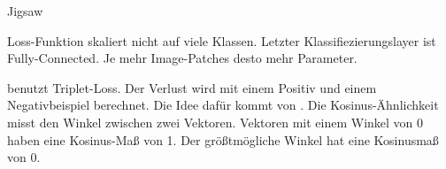 
Jigsaw
\cite{NorooziUnsupervisedLearningVisual2016}

\cite{DosovitskiyDiscriminativeUnsupervisedFeature2016} Loss-Funktion skaliert nicht auf viele Klassen.
Letzter Klassifiezierungslayer ist Fully-Connected. Je mehr Image-Patches desto mehr Parameter.

\cite{DoerschMultitaskSelfSupervisedVisual2017} benutzt Triplet-Loss.
Der Verlust wird mit einem Positiv und einem Negativbeispiel berechnet.
Die Idee dafür kommt von \citeauthor{WangUnsupervisedLearningVisual2015}.
Die Kosinus-Ähnlichkeit misst den Winkel zwischen zwei Vektoren. Vektoren mit einem Winkel von 0 haben
eine Kosinus-Maß von 1. Der größtmögliche Winkel hat eine Kosinusmaß von 0.
